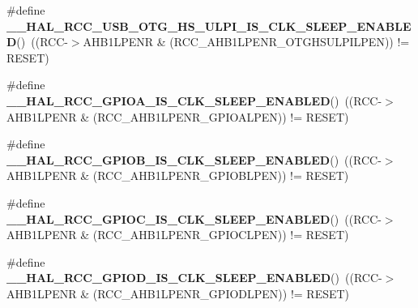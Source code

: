 \begin{DoxyCompactItemize}
\item 
\mbox{\label{group___r_c_c___clock___sleep___enable___disable___status_ga279241e2312097f8ca4030331cbc45aa}} 
\#define {\bfseries \+\_\+\+\_\+\+H\+A\+L\+\_\+\+R\+C\+C\+\_\+\+U\+S\+B\+\_\+\+O\+T\+G\+\_\+\+H\+S\+\_\+\+U\+L\+P\+I\+\_\+\+I\+S\+\_\+\+C\+L\+K\+\_\+\+S\+L\+E\+E\+P\+\_\+\+E\+N\+A\+B\+L\+ED}()~((R\+CC-\/$>$A\+H\+B1\+L\+P\+E\+NR \& (R\+C\+C\+\_\+\+A\+H\+B1\+L\+P\+E\+N\+R\+\_\+\+O\+T\+G\+H\+S\+U\+L\+P\+I\+L\+P\+EN)) != R\+E\+S\+ET)
\item 
\mbox{\label{group___r_c_c___clock___sleep___enable___disable___status_gabfca340e2266b35f9eb8bda9f24fb272}} 
\#define {\bfseries \+\_\+\+\_\+\+H\+A\+L\+\_\+\+R\+C\+C\+\_\+\+G\+P\+I\+O\+A\+\_\+\+I\+S\+\_\+\+C\+L\+K\+\_\+\+S\+L\+E\+E\+P\+\_\+\+E\+N\+A\+B\+L\+ED}()~((R\+CC-\/$>$A\+H\+B1\+L\+P\+E\+NR \& (R\+C\+C\+\_\+\+A\+H\+B1\+L\+P\+E\+N\+R\+\_\+\+G\+P\+I\+O\+A\+L\+P\+EN)) != R\+E\+S\+ET)
\item 
\mbox{\label{group___r_c_c___clock___sleep___enable___disable___status_gae5f9c8d570ca5ce52bd3d1766ad96265}} 
\#define {\bfseries \+\_\+\+\_\+\+H\+A\+L\+\_\+\+R\+C\+C\+\_\+\+G\+P\+I\+O\+B\+\_\+\+I\+S\+\_\+\+C\+L\+K\+\_\+\+S\+L\+E\+E\+P\+\_\+\+E\+N\+A\+B\+L\+ED}()~((R\+CC-\/$>$A\+H\+B1\+L\+P\+E\+NR \& (R\+C\+C\+\_\+\+A\+H\+B1\+L\+P\+E\+N\+R\+\_\+\+G\+P\+I\+O\+B\+L\+P\+EN)) != R\+E\+S\+ET)
\item 
\mbox{\label{group___r_c_c___clock___sleep___enable___disable___status_ga91d9bb261e4eb51ae5c83276ca94ba9e}} 
\#define {\bfseries \+\_\+\+\_\+\+H\+A\+L\+\_\+\+R\+C\+C\+\_\+\+G\+P\+I\+O\+C\+\_\+\+I\+S\+\_\+\+C\+L\+K\+\_\+\+S\+L\+E\+E\+P\+\_\+\+E\+N\+A\+B\+L\+ED}()~((R\+CC-\/$>$A\+H\+B1\+L\+P\+E\+NR \& (R\+C\+C\+\_\+\+A\+H\+B1\+L\+P\+E\+N\+R\+\_\+\+G\+P\+I\+O\+C\+L\+P\+EN)) != R\+E\+S\+ET)
\item 
\mbox{\label{group___r_c_c___clock___sleep___enable___disable___status_ga9be4e7cb3610f3242eedb2c38f05cafe}} 
\#define {\bfseries \+\_\+\+\_\+\+H\+A\+L\+\_\+\+R\+C\+C\+\_\+\+G\+P\+I\+O\+D\+\_\+\+I\+S\+\_\+\+C\+L\+K\+\_\+\+S\+L\+E\+E\+P\+\_\+\+E\+N\+A\+B\+L\+ED}()~((R\+CC-\/$>$A\+H\+B1\+L\+P\+E\+NR \& (R\+C\+C\+\_\+\+A\+H\+B1\+L\+P\+E\+N\+R\+\_\+\+G\+P\+I\+O\+D\+L\+P\+EN)) != R\+E\+S\+ET)

\end{DoxyCompactItemize}

